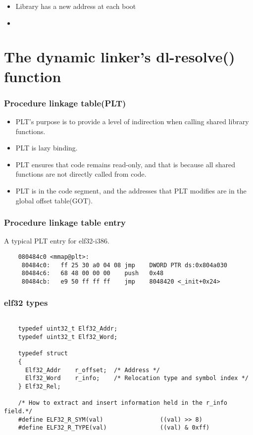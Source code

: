 \documentclass[10pt]{beamer}
\begin{document}
\begin{frame}
\begin{itemize}
\item Library has a new address at each boot
\item
\end{itemize}

\end{frame}



\section{The dynamic linker's dl-resolve() function}  %

\begin{frame}[fragile]
\frametitle{Procedure linkage table(PLT)}

 \begin{itemize}
    \item PLT's purpose is to provide a level of indirection when calling shared library functions.
    \item PLT is lazy binding.
    \item PLT ensures that code remains read-only, and that is because all shared functions are not directly called from code.
    \item PLT is in the code segment, and the addresses that PLT modifies are in the global offset table(GOT).
  \end{itemize}

\end{frame}

\begin{frame}[fragile]
\frametitle{Procedure linkage table entry}
A typical PLT entry for elf32-i386.
	\begin{verbatim}
	080484c0 <mmap@plt>:
	 80484c0:	ff 25 30 a0 04 08 jmp    DWORD PTR ds:0x804a030
	 80484c6:	68 48 00 00 00    push   0x48
	 80484cb:	e9 50 ff ff ff    jmp    8048420 <_init+0x24>
	\end{verbatim}


\end{frame}

\begin{frame}[fragile]
\frametitle{elf32 types}

	\footnotesize
	\begin{verbatim}

	typedef uint32_t Elf32_Addr;
	typedef uint32_t Elf32_Word;

	typedef struct
	{
	  Elf32_Addr    r_offset;  /* Address */
	  Elf32_Word    r_info;    /* Relocation type and symbol index */
	} Elf32_Rel;

	/* How to extract and insert information held in the r_info field.*/
	#define ELF32_R_SYM(val)                ((val) >> 8)
	#define ELF32_R_TYPE(val)               ((val) & 0xff)
	\end{verbatim}
	\normalsize

\end{frame}
\end{document}
